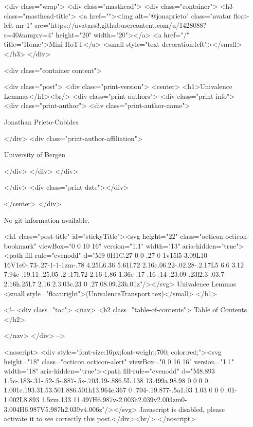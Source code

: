     <div class="wrap">
      <div class="masthead">
        <div class="container">
          <h3 class="masthead-title">
            <a href=""><img alt="@jonaprieto" class="avatar float-left mr-1" src="https://avatars3.githubusercontent.com/u/1428088?s=40&amp;v=4" height="20" width="20"></a>
            <a href="/" title="Home">Mini-HoTT</a>
            <small style="text-decoration:left"></small>
          </h3>
        </div>
      
      <div class="container content">
        







<div class="post">
  <div class="print-version">
    <center>
      <h1>Univalence Lemmas</h1><br/>
        <div class="print-authors">
          <div class="print-info">
            <div class="print-author">
              <div class="print-author-name">
                
                  Jonathan Prieto-Cubides
                
              </div>
              <div class="print-author-affiliation">
                
                  University of Bergen
                
                </div>
            </div>
          </div>
          
          
        </div>
        <div class="print-date"></div>
        
        
    </center>
  </div>

  
  No git information available.
  

  <h1 class="post-title" id="stickyTitle"><svg height="22" class="octicon octicon-bookmark" viewBox="0 0 10 16" version="1.1" width="13" aria-hidden="true"><path fill-rule="evenodd" d="M9 0H1C.27 0 0 .27 0 1v15l5-3.09L10 16V1c0-.73-.27-1-1-1zm-.78 4.25L6.36 5.61l.72 2.16c.06.22-.02.28-.2.17L5 6.6 3.12 7.94c-.19.11-.25.05-.2-.17l.72-2.16-1.86-1.36c-.17-.16-.14-.23.09-.23l2.3-.03.7-2.16h.25l.7 2.16 2.3.03c.23 0 .27.08.09.23h.01z"/></svg> Univalence Lemmas <small style="float:right">(UnivalenceTransport.tex)</small>
  </h1>

  <!-- 
  <div class="toc">
    <nav>
    <h2 class="table-of-contents"> Table of Contents </h2>
      

    </nav>
  </div>
   -->

  <noscript>
  <div style="font-size:16px;font-weight:700; color:red;"><svg height="18" class="octicon octicon-alert" viewBox="0 0 16 16" version="1.1" width="18" aria-hidden="true"><path fill-rule="evenodd" d="M8.893 1.5c-.183-.31-.52-.5-.887-.5s-.703.19-.886.5L.138 13.499a.98.98 0 0 0 0 1.001c.193.31.53.501.886.501h13.964c.367 0 .704-.19.877-.5a1.03 1.03 0 0 0 .01-1.002L8.893 1.5zm.133 11.497H6.987v-2.003h2.039v2.003zm0-3.004H6.987V5.987h2.039v4.006z"/></svg> Javascript is disabled, please activate it to see correctly this post.</div><br/>
  </noscript>

